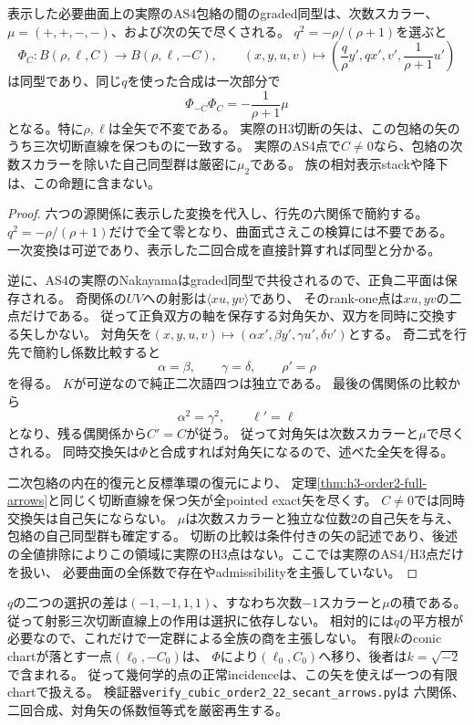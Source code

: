 \begin{proposition}[可逆secantの幾何学的矢]
\label{prop:h3-order2-22-secant-arrows}
表示した必要曲面上の実際のAS4包絡の間のgraded同型は、次数スカラー、
$\mu=(+,+,-,-)$、および次の矢で尽くされる。
$ q^2=-\rho/(\rho+1)$を選ぶと
\[
 \Phi_C:B(\rho,\ell,C)\longrightarrow B(\rho,\ell,-C),\qquad
 (x,y,u,v)\longmapsto
 \left(\frac q\rho y',q x',v',\frac1{\rho+1}u'\right)
\]
は同型であり、同じ$q$を使った合成は一次部分で
\[
 \Phi_{-C}\Phi_C=-\frac1{\rho+1}\mu
\]
となる。特に$\rho,\ell$は全矢で不変である。
実際のH3切断の矢は、この包絡の矢のうち三次切断直線を保つものに一致する。
実際のAS4点で$C\ne0$なら、包絡の次数スカラーを除いた自己同型群は厳密に$\mu_2$である。
族の相対表示stackや降下は、この命題に含まない。
\end{proposition}
\begin{proof}
六つの源関係に表示した変換を代入し、行先の六関係で簡約する。
$q^2=-\rho/(\rho+1)$だけで全て零となり、曲面式さえこの検算には不要である。
一次変換は可逆であり、表示した二回合成を直接計算すれば同型と分かる。

逆に、AS4の実際のNakayamaはgraded同型で共役されるので、正負二平面は保存される。
奇関係の$UV$への射影は$\langle xu,yv\rangle$であり、
そのrank-one点は$xu,yv$の二点だけである。
従って正負双方の軸を保存する対角矢か、双方を同時に交換する矢しかない。
対角矢を$(x,y,u,v)\mapsto(\alpha x',\beta y',\gamma u',\delta v')$とする。
奇二式を行先で簡約し係数比較すると
\[
 \alpha=\beta,\qquad\gamma=\delta,\qquad\rho'=\rho
\]
を得る。
$K$が可逆なので純正二次語四つは独立である。
最後の偶関係の比較から
\[
 \alpha^2=\gamma^2,\qquad\ell'=\ell
\]
となり、残る偶関係から$C'=C$が従う。
従って対角矢は次数スカラーと$\mu$で尽くされる。
同時交換矢は$\Phi$と合成すれば対角矢になるので、述べた全矢を得る。

二次包絡の内在的復元と反標準環の復元により、
定理\ref{thm:h3-order2-full-arrows}と同じく切断直線を保つ矢が全pointed exact矢を尽くす。
$C\ne0$では同時交換矢は自己矢にならない。
$\mu$は次数スカラーと独立な位数2の自己矢を与え、包絡の自己同型群も確定する。
切断の比較は条件付きの矢の記述であり、後述の全値排除によりこの領域に実際のH3点はない。ここでは実際のAS4/H3点だけを扱い、
必要曲面の全係数で存在やadmissibilityを主張していない。
\end{proof}

$q$の二つの選択の差は$(-1,-1,1,1)$、すなわち次数$-1$スカラーと$\mu$の積である。
従って射影三次切断直線上の作用は選択に依存しない。
相対的には$q$の平方根が必要なので、これだけで一定群による全族の商を主張しない。
有限$k$のconic chartが落とす一点$(\ell_0,-C_0)$は、
$\Phi$により$(\ell_0,C_0)$へ移り、後者は$k=\sqrt{-2}$で含まれる。
従って幾何学的点の正常incidenceは、この矢を使えば一つの有限chartで扱える。
検証器\texttt{verify\_cubic\_order2\_22\_secant\_arrows.py}は
六関係、二回合成、対角矢の係数恒等式を厳密再生する。

